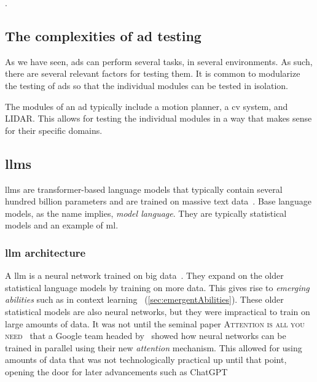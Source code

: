 .

\subsection*{The complexities of \acrshort{ad} testing}\label{sec:adsTestingComplexity}

As we have seen, \acrshort{ads} can perform several tasks, in several environments. As such, there
are several relevant factors for testing them. It is common to modularize the testing of
\acrshort{ads} so that the individual modules can be tested in isolation.

The modules of an \acrshort{ad} typically include a motion planner, a \acrfull{cv} system, and
LIDAR. This allows for testing the individual modules in a way that makes sense for their specific
domains.


\subsection{\acrfull{llms}}

\acrfull{llms} are transformer-based language models that typically contain several hundred billion
parameters and are trained on massive text data~\cite[4]{llmSurvey}.
Base language models, as the name implies, \textit{model language}. They are typically statistical
models and an example of \acrfull{ml}.

\subsubsection*{\acrfull{llm} architecture}\label{sec:llmArch}

A \acrlong{llm} is a neural network trained on big
data~\cite[3]{llmSurvey}. They expand on the older statistical language models by
training on more data. This gives rise to \textit{emerging abilities} such as in
context learning~\cite[3]{llmSurvey} (\cref{sec:emergentAbilities}). These older statistical models are also
neural networks, but they were impractical to train on large amounts of data. It
was not until the seminal paper \textsc{Attention is all you
    need}~\cite{attentionIsAllYouNeed} that a Google team headed by~\citeauthor{attentionIsAllYouNeed} showed how neural networks
can be trained in parallel using their new \textit{attention} mechanism. This
allowed for using amounts of data that was not technologically practical up
until that point, opening the door for later advancements such as
ChatGPT~\cite[9]{llmSurvey}

